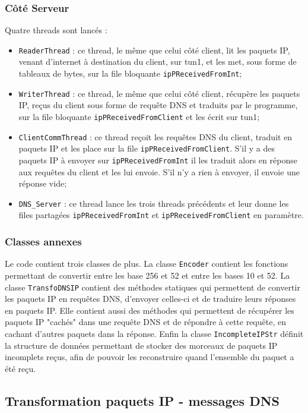 \documentclass[a4paper,12pt]{article}
\begin{document}
		\subsubsection{Côté Serveur}
		Quatre threads sont lancés :
		\begin{itemize}
			\item \verb?ReaderThread? : ce thread, le même que celui côté client, lit les paquets IP, venant d'internet à destination du client, sur tun1, et les met, sous forme de tableaux de bytes, sur la file bloquante \verb?ipPReceivedFromInt?;
			\item \verb?WriterThread? : ce thread, le même que celui côté client, récupère les paquets IP, reçus du client sous forme de requête DNS et traduits par le programme, sur la file bloquante \verb?ipPReceivedFromClient? et les écrit sur tun1;
			\item \verb?ClientCommThread? : ce thread reçoit les requêtes DNS du client, traduit en paquets IP et les place sur la file \verb?ipPReceivedFromClient?. S'il y a des paquets IP à envoyer sur \verb?ipPReceivedFromInt? il les traduit alors en réponse aux requêtes du client et les lui envoie. S'il n'y a rien à envoyer, il envoie une réponse vide;
			\item \verb?DNS_Server? : ce thread lance les trois threads précédents et leur donne les files partagées \verb?ipPReceivedFromInt? et \verb?ipPReceivedFromClient? en paramètre.
		\end{itemize}
		
		\subsubsection{Classes annexes}
		Le code contient trois classes de plus. La classe \verb?Encoder? contient les fonctions permettant de convertir entre les base 256 et 52 et entre les bases 10 et 52. La classe \verb?TransfoDNSIP? contient des méthodes statiques qui permettent de convertir les paquets IP en requêtes DNS, d'envoyer celles-ci et de traduire leurs réponses en paquets IP. Elle contient aussi des méthodes qui permettent de récupérer les paquets IP "cachés" dans une requête DNS et de répondre à cette requête, en cachant d'autres paquets dans la réponse. Enfin la classe \verb?IncompleteIPStr? définit la structure de données permettant de stocker des morceaux de paquets IP incomplets reçus, afin de pouvoir les reconstruire quand l'ensemble du paquet a été reçu.
		
		
	\subsection{Transformation paquets IP - messages DNS}
\end{document}
